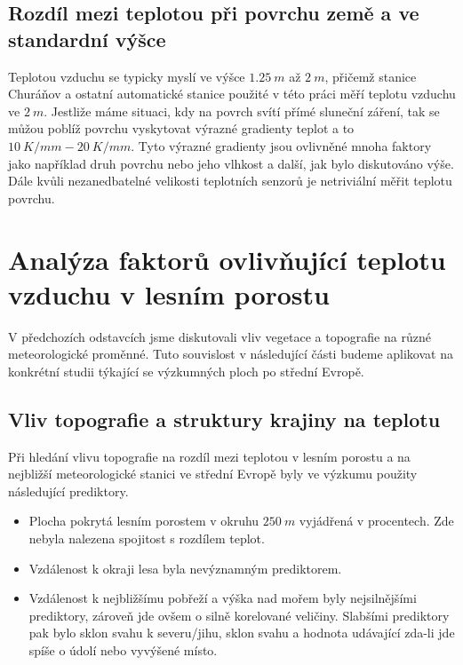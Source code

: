
\subsection{Rozdíl mezi teplotou při povrchu země a ve standardní výšce}
Teplotou vzduchu se typicky myslí ve výšce $\SI{1.25}{m}$ až $\SI{2}{m}$\cite{wmo2021}, přičemž stanice Churáňov a ostatní automatické stanice použité v této práci měří teplotu vzduchu ve $\SI{2}{m}$\cite{churanov}. Jestliže máme situaci, kdy na povrch svítí přímé sluneční záření, tak se můžou poblíž povrchu vyskytovat výrazné gradienty teplot a to $\SI{10}{K/mm}-\SI{20}{K/mm}$. Tyto výrazné gradienty jsou ovlivněné mnoha faktory jako například druh povrchu nebo jeho vlhkost a další, jak bylo diskutováno výše. Dále kvůli nezanedbatelné velikosti teplotních senzorů je netriviální měřit teplotu povrchu\cite{arya2001}. 

\section{Analýza faktorů ovlivňující teplotu vzduchu v lesním porostu}
V předchozích odstavcích jsme diskutovali vliv vegetace a topografie na různé meteorologické proměnné. Tuto souvislost v následující části budeme aplikovat na konkrétní studii týkající se výzkumných ploch po střední Evropě.

\subsection{Vliv topografie a struktury krajiny na teplotu}
Při hledání vlivu topografie na rozdíl mezi teplotou v lesním porostu a na nejbližší meteorologické stanici ve střední Evropě byly ve výzkumu \cite{ZellwegerFlorian2019Sdou} použity následující prediktory.

\begin{itemize}
	\item Plocha pokrytá lesním porostem v okruhu $\SI{250}{m}$ vyjádřená v procentech. Zde nebyla nalezena spojitost s rozdílem teplot.
	\item Vzdálenost k okraji lesa byla nevýznamným prediktorem. 
	\item Vzdálenost k nejbližšímu pobřeží a výška nad mořem byly nejsilnějšími prediktory, zároveň jde ovšem o silně korelované veličiny. Slabšími prediktory pak bylo sklon svahu k severu/jihu, sklon svahu a hodnota udávající zda-li jde spíše o údolí nebo vyvýšené místo.
\end{itemize}

